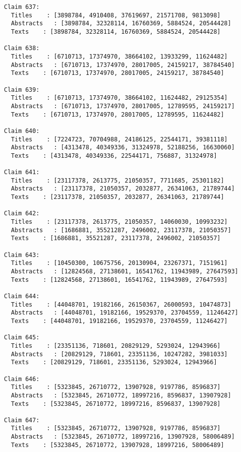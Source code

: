 \documentclass[11pt]{article}
\begin{document}
\begin{Verbatim}[commandchars=\\\{\}]
Claim 637:
  Titles    : [3898784, 4910408, 37619697, 21571708, 9813098]
  Abstracts   : [3898784, 32328114, 16760369, 5884524, 20544428]
  Texts    : [3898784, 32328114, 16760369, 5884524, 20544428]

Claim 638:
  Titles    : [6710713, 17374970, 38664102, 13933299, 11624482]
  Abstracts   : [6710713, 17374970, 28017005, 24159217, 38784540]
  Texts    : [6710713, 17374970, 28017005, 24159217, 38784540]

Claim 639:
  Titles    : [6710713, 17374970, 38664102, 11624482, 29125354]
  Abstracts   : [6710713, 17374970, 28017005, 12789595, 24159217]
  Texts    : [6710713, 17374970, 28017005, 12789595, 11624482]

Claim 640:
  Titles    : [7224723, 70704988, 24186125, 22544171, 39381118]
  Abstracts   : [4313478, 40349336, 31324978, 52188256, 16630060]
  Texts    : [4313478, 40349336, 22544171, 756887, 31324978]

Claim 641:
  Titles    : [23117378, 2613775, 21050357, 7711685, 25301182]
  Abstracts   : [23117378, 21050357, 2032877, 26341063, 21789744]
  Texts    : [23117378, 21050357, 2032877, 26341063, 21789744]

Claim 642:
  Titles    : [23117378, 2613775, 21050357, 14060030, 10993232]
  Abstracts   : [1686881, 35521287, 2496002, 23117378, 21050357]
  Texts    : [1686881, 35521287, 23117378, 2496002, 21050357]

Claim 643:
  Titles    : [10450300, 10675756, 20130904, 23267371, 7151961]
  Abstracts   : [12824568, 27138601, 16541762, 11943989, 27647593]
  Texts    : [12824568, 27138601, 16541762, 11943989, 27647593]

Claim 644:
  Titles    : [44048701, 19182166, 26150367, 26000593, 10474873]
  Abstracts   : [44048701, 19182166, 19529370, 23704559, 11246427]
  Texts    : [44048701, 19182166, 19529370, 23704559, 11246427]

Claim 645:
  Titles    : [23351136, 718601, 20829129, 5293024, 12943966]
  Abstracts   : [20829129, 718601, 23351136, 10247282, 3981033]
  Texts    : [20829129, 718601, 23351136, 5293024, 12943966]

Claim 646:
  Titles    : [5323845, 26710772, 13907928, 9197786, 8596837]
  Abstracts   : [5323845, 26710772, 18997216, 8596837, 13907928]
  Texts    : [5323845, 26710772, 18997216, 8596837, 13907928]

Claim 647:
  Titles    : [5323845, 26710772, 13907928, 9197786, 8596837]
  Abstracts   : [5323845, 26710772, 18997216, 13907928, 58006489]
  Texts    : [5323845, 26710772, 13907928, 18997216, 58006489]


\end{Verbatim}
\end{document}
